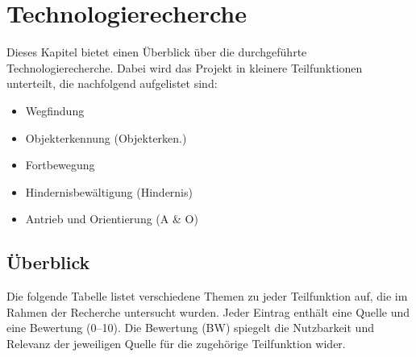 \documentclass[../main.tex]{subfiles}
\begin{document}
\newpage
\section{Technologierecherche}\label{technologierecherche}

Dieses Kapitel bietet einen Überblick über die durchgeführte Technologierecherche.
Dabei wird das Projekt in kleinere Teilfunktionen unterteilt, die nachfolgend aufgelistet sind:
\begin{itemize}
    \item Wegfindung 
    \item Objekterkennung (Objekterken.)
    \item Fortbewegung
    \item Hindernisbewältigung (Hindernis)
    \item Antrieb und Orientierung (A \& O)
\end{itemize}


\subsection{Überblick}
Die folgende Tabelle listet verschiedene Themen zu jeder Teilfunktion auf, die im Rahmen der Recherche untersucht wurden. Jeder Eintrag enthält eine Quelle und eine Bewertung (0–10). Die Bewertung (BW) spiegelt die Nutzbarkeit und Relevanz der jeweiligen Quelle für die zugehörige Teilfunktion wider.
\end{document}
